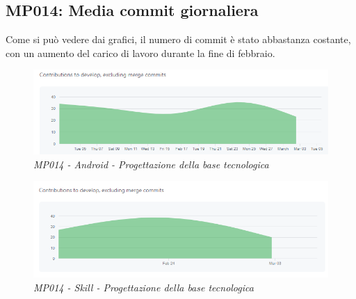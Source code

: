 \subsection{MP014: Media commit giornaliera}
Come si può vedere dai grafici, il numero di commit è stato abbastanza costante, con un aumento del carico di lavoro durante la fine di febbraio.
\begin{figure} [H]
    \centering
	\includegraphics[scale=0.5]{./images/dailycommits_kotlin.PNG}
    \caption{\textit{MP014 - Android - Progettazione della base tecnologica}}
\end{figure}
\begin{figure} [H]
    \centering
	\includegraphics[scale=0.5]{./images/daycommits_js.PNG}
    \caption{\textit{MP014 - Skill - Progettazione della base tecnologica}}
\end{figure}


